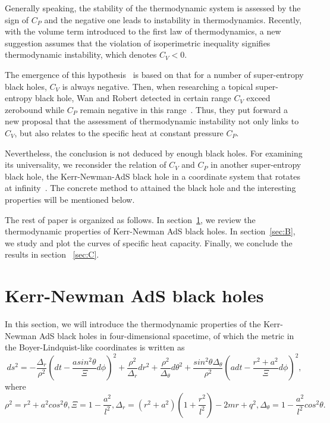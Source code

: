 \documentclass[aps,preprint]{revtex4}%
\begin{document}
Generally speaking, the stability of the thermodynamic system is assessed by the
sign of $C_{P}$ and the negative one leads to instability in thermodynamics. Recently, with the volume term introduced to the first law of thermodynamics, a new suggestion assumes that the violation of isoperimetric inequality signifies thermodynamic instability, which denotes $C_{V}<0$.

The emergence of this hypothesis~\cite{Johnson:2019mdp} is based on that for a number of super-entropy black holes, $C_{V}$ is always negative.
Then, when researching a topical super-entropy black hole, Wan and Robert detected in certain range $C_{V}$ exceed zerobound while $C_{P}$ remain negative in this range~\cite{Cong:2019bud}.
Thus, they put forward a new proposal that the assessment of thermodynamic instability not only links to $C_{V}$, but also relates to the specific heat at constant pressure $C_{P}$.

Nevertheless, the conclusion is not deduced by enough black holes. For examining its universality, we reconsider the relation of $C_{V}$ and $C_{P}$ in another super-entropy black hole, the Kerr-Newman-AdS black hole in a coordinate system that rotates at infinity~\cite{Hennigar:2014cfa}. The concrete method to attained the black hole and the interesting properties will be mentioned below.


The rest of paper is organized as follows. In section~\ref{sec:A}, we review the thermodynamic
properties of Kerr-Newman AdS black holes. In section~\ref{sec:B}, we study and plot the curves of specific heat capacity. Finally, we conclude the results in section
~\ref{sec:C}.




\section{Kerr-Newman AdS black holes}
\label{sec:A}
In this section, we will introduce the thermodynamic properties of the Kerr-Newman AdS black holes in four-dimensional spacetime, of which the metric in the Boyer-Lindquist-like coordinates is written as
\begin{equation}\label{eqn:Q1}
ds^{2}=-\frac{\Delta_{r}}{\rho^{2}}(dt-\frac{asin^{2}\theta}{\Xi}d\phi)^{2}+\frac{\rho^{2}}{\Delta_{r}}dr^{2}+\frac{\rho^{2}}{\Delta_{\theta}}d\theta^{2}+\frac{sin^{2}\theta\Delta_{\theta}}{\rho^{2}}(adt-\frac{r^{2}+a^{2}}{\Xi}d\phi)^{2},
\end{equation}
where
\begin{equation}\label{eqn:Q2}
\rho^{2}=r^{2}+a^{2}cos^{2}\theta, \Xi=1-\frac{a^{2}}{l^{2}},\Delta_{r}=(r^{2}+a^{2})(1+\frac{r^{2}}{l^{2}})-2mr+q^{2},\Delta_{\theta}=1-\frac{a^{2}}{l^{2}}cos^{2}\theta.
\end{equation}
\end{document}
